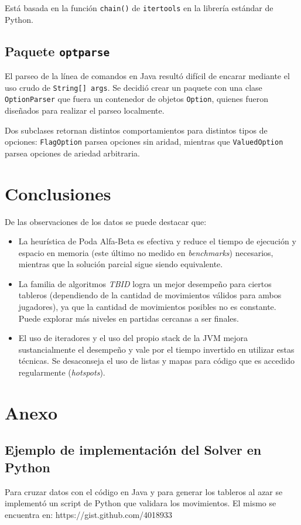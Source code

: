 \documentclass[10pt,a4paper,notitlepage]{article}
\begin{document}
Está basada en la función \texttt{chain()} de \texttt{itertools} en la librería estándar de Python.
 
\subsection{Paquete \texttt{optparse}}
El parseo de la línea de comandos en Java resultó difícil de encarar mediante el uso crudo de \texttt{String[] args}. Se decidió crear un paquete con una clase \texttt{OptionParser} que fuera un contenedor de objetos \texttt{Option}, quienes fueron diseñados para realizar el parseo localmente.

Dos subclases retornan distintos comportamientos para distintos tipos de opciones: \texttt{FlagOption} parsea opciones sin aridad, mientras que \texttt{ValuedOption} parsea opciones de ariedad arbitraria.
\section{Conclusiones}


De las observaciones de los datos se puede destacar que:
\begin{itemize}
\item La heurística de Poda Alfa-Beta es efectiva y reduce el tiempo de ejecución y espacio en memoria (este último no medido en \textit{benchmarks}) necesarios, mientras que la solución parcial sigue siendo equivalente.
\item La familia de algoritmos \textit{TBID} logra un mejor desempeño para ciertos tableros (dependiendo de la cantidad de movimientos válidos para ambos jugadores), ya que la cantidad de movimientos posibles no es constante. Puede explorar más niveles en partidas cercanas a ser finales.
\item El uso de iteradores y el uso del propio stack de la JVM mejora sustancialmente el desempeño y vale por el tiempo invertido en utilizar estas técnicas. Se desaconseja el uso de listas y mapas para código que es accedido regularmente (\textit{hotspots}). 
\end{itemize}

\newpage
\section{Anexo}
\subsection{Ejemplo de implementación del Solver en Python}
Para cruzar datos con el código en Java y para generar los tableros al azar se implementó un script de Python que validara los movimientos. El mismo se encuentra en: https://gist.github.com/4018933
\end{document}
